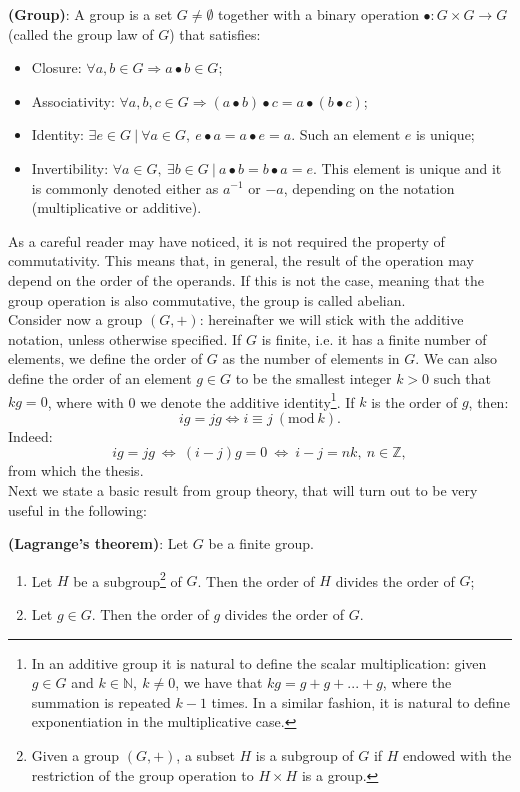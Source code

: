 \begin{mydef} {\bf (Group)}: A group is a set $G \neq \emptyset$ together with a binary operation $\bullet: G \times G \to G$ (called the 	group law of $G$) that satisfies:
	\begin{itemize}
		\item Closure: $\forall a, b \in G  \Longrightarrow a \bullet b \in G$;
		\item Associativity: $\forall a, b, c \in G  \Longrightarrow (a \bullet b) \bullet c = a \bullet (b \bullet c)$;
		\item Identity: $\exists e \in G \ | \ \forall a \in G, \ e \bullet a = a \bullet e = a$. Such an element $e$ is unique; 
		\item Invertibility: $\forall a \in G, \ \exists b \in G \ | \ a \bullet b = b \bullet a = e$. This element is unique and it is commonly denoted either as $a^{-1}$ or $-a$, depending on the notation (multiplicative or additive).
	\end{itemize}
\end{mydef}
\label{def1}
\noindent
As a careful reader may have noticed, it is not required the property of commutativity. This means that, in general, the result of the operation may depend on the order of the operands. If this is not the case, meaning that the group operation is also commutative, the group is called abelian.
\\
Consider now a group $(G, +)$: hereinafter we will stick with the additive notation, unless otherwise specified.
If $G$ is finite, i.e. it has a finite number of elements, we define the order of $G$ as the number of elements in $G$. We can also define the order of an element $g \in G$ to be the smallest integer $k > 0$ such that $kg = 0$, where with 0 we denote the additive identity\footnote{In an additive group it is natural to define the scalar multiplication: given $g \in G$ and $k \in \mathbb{N}, \ k \neq 0$, we have that $kg = g + g + ... + g$, where the summation is repeated $k - 1$ times. In a similar fashion, it is natural to define exponentiation in the multiplicative case.}. If $k$ is the order of $g$, then:
$$ig = jg \Longleftrightarrow i \equiv j \ (\text{mod} \ k).$$
Indeed:
$$ig = jg \ \Longleftrightarrow \ (i - j)g = 0 \ \Longleftrightarrow \ i - j = nk, \ n \in \mathbb{Z},$$
from which the thesis.
\\
Next we state a basic result from group theory, that will turn out to be very useful in the following:
\begin{thm} {\bf (Lagrange's theorem)}:
	Let $G$ be a finite group.
	\begin{enumerate}
		\item Let $H$ be a subgroup\footnote{Given a group $(G, +)$, a subset $H$ is a subgroup of $G$ if $H$ endowed with the restriction of the group operation to $H \times H$ is a group.} of $G$. Then the order of $H$ divides the order of $G$;
		\item Let $g \in G$. Then the order of $g$ divides the order of $G$.
	\end{enumerate}
\end{thm}

